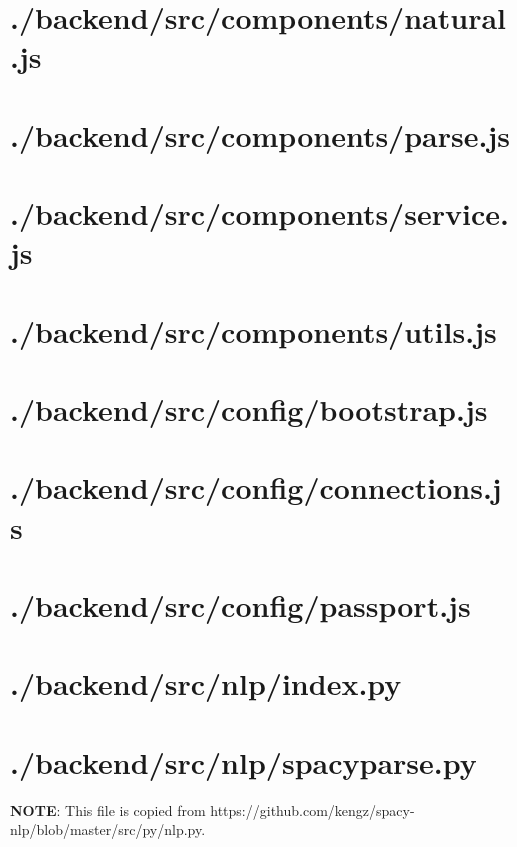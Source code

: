 \documentclass[11pt]{informatics-report}
\begin{document}
\newpage
\section{./backend/src/components/natural.js}


\newpage
\section{./backend/src/components/parse.js}


\newpage
\section{./backend/src/components/service.js}


\newpage
\section{./backend/src/components/utils.js}


\newpage
\section{./backend/src/config/bootstrap.js}


\newpage
\section{./backend/src/config/connections.js}


\newpage
\section{./backend/src/config/passport.js}


\newpage
\section{./backend/src/nlp/index.py}


\newpage
\section{./backend/src/nlp/spacyparse.py}
\textbf{NOTE}: This file is copied from https://github.com/kengz/spacy-nlp/blob/master/src/py/nlp.py.
\end{document}

